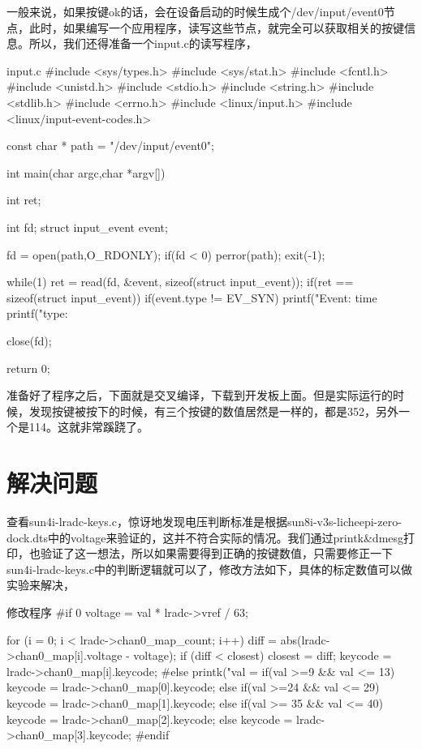 \documentclass[lang=cn,newtx,10pt,scheme=chinese]{elegantbook}
\begin{document}
一般来说，如果按键ok的话，会在设备启动的时候生成个/dev/input/event0节点，此时，如果编写一个应用程序，读写这些节点，就完全可以获取相关的按键信息。所以，我们还得准备一个input.c的读写程序，

\begin{mycode}{input.c}
#include <sys/types.h>
#include <sys/stat.h>
#include <fcntl.h>
#include <unistd.h>
#include <stdio.h>
#include <string.h>
#include <stdlib.h>
#include <errno.h>
#include <linux/input.h>
#include <linux/input-event-codes.h>

const char * path = "/dev/input/event0";

int main(char argc,char *argv[])
{
    int ret;

    int fd;
    struct input_event event;

    fd = open(path,O_RDONLY);
    if(fd < 0)
    {
        perror(path);
        exit(-1);
    }

    while(1)
    {
        ret = read(fd, &event, sizeof(struct input_event));
        if(ret == sizeof(struct input_event))
        {
            if(event.type != EV_SYN)
            {
                printf("Event: time %
                printf("type:%
            }
        }
    }
 
    close(fd);

    return 0;
}
\end{mycode}

准备好了程序之后，下面就是交叉编译，下载到开发板上面。但是实际运行的时候，发现按键被按下的时候，有三个按键的数值居然是一样的，都是352，另外一个是114。这就非常蹊跷了。

\section{解决问题}

查看sun4i-lradc-keys.c，惊讶地发现电压判断标准是根据sun8i-v3s-licheepi-zero-dock.dts中的voltage来验证的，这并不符合实际的情况。我们通过printk\&dmesg打印，也验证了这一想法，所以如果需要得到正确的按键数值，只需要修正一下sun4i-lradc-keys.c中的判断逻辑就可以了，修改方法如下，具体的标定数值可以做实验来解决，

\begin{mycode}{修改程序}
#if 0
        voltage = val * lradc->vref / 63;

        for (i = 0; i < lradc->chan0_map_count; i++) {
            diff = abs(lradc->chan0_map[i].voltage - voltage);
            if (diff < closest) {
                closest = diff;
                keycode = lradc->chan0_map[i].keycode;
            }
        }
#else
        printk("val = %
        if(val >=9 && val <= 13)
            keycode = lradc->chan0_map[0].keycode;
        else if(val >=24 && val <= 29)
            keycode = lradc->chan0_map[1].keycode;
        else if(val >= 35 && val <= 40)
            keycode = lradc->chan0_map[2].keycode;
        else
            keycode = lradc->chan0_map[3].keycode;
#endif
\end{mycode}
\end{document}
